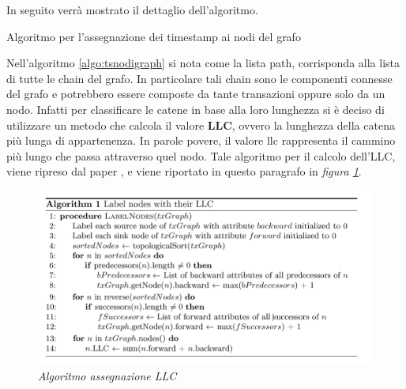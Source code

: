 In seguito verrà mostrato il dettaglio dell'algoritmo.
\\
\begin{algorithm}[h]
	\caption{Algoritmo per l'assegnazione dei timestamp ai nodi del grafo} \label{algo:tsnodigraph}

\end{algorithm}

Nell'algoritmo \ref{algo:tsnodigraph} si nota come la lista path, corrisponda alla lista di tutte le chain del grafo. In particolare tali chain sono le componenti connesse del grafo e potrebbero essere composte da tante transazioni oppure solo da un nodo. Infatti per classificare le catene in base alla loro lunghezza si è deciso di utilizzare un metodo che calcola il valore \textbf{LLC}, ovvero la lunghezza della catena più lunga di appartenenza. In parole povere, il valore llc rappresenta il cammino più lungo che passa attraverso quel nodo.
Tale algoritmo per il calcolo dell'LLC, viene ripreso dal paper \cite{ddp-ltcbh-17}, e viene riportato in questo paragrafo in \textit{figura \ref{fig:llcalgo}}.
\\
\begin{figure}[htbp]
	\centering
	\includegraphics[width = \linewidth]{figure/llcalgo}
	\caption{\textit{Algoritmo assegnazione LLC} \cite{ddp-ltcbh-17} \label{fig:llcalgo}}
\end{figure}\\

